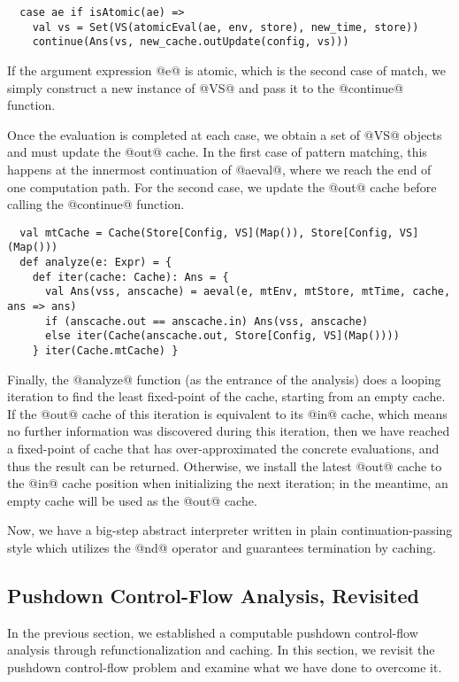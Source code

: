 \documentclass[acmsmall, screen]{acmart}\settopmatter{}
\begin{document}
\begin{lstlisting}
  case ae if isAtomic(ae) =>
    val vs = Set(VS(atomicEval(ae, env, store), new_time, store))
    continue(Ans(vs, new_cache.outUpdate(config, vs)))
\end{lstlisting}

If the argument expression @e@ is atomic, which is the second case of match, we simply
construct a new instance of @VS@ and pass it to the @continue@ function.

Once the evaluation is completed at each case, we obtain a set of @VS@ objects and must
update the @out@ cache. In the first case of pattern matching, this happens at the
innermost continuation of @aeval@, where we reach the end of one computation path.
For the second case, we update the @out@ cache before calling the @continue@ function.

\begin{lstlisting}
  val mtCache = Cache(Store[Config, VS](Map()), Store[Config, VS](Map()))
  def analyze(e: Expr) = {
    def iter(cache: Cache): Ans = {
      val Ans(vss, anscache) = aeval(e, mtEnv, mtStore, mtTime, cache, ans => ans)
      if (anscache.out == anscache.in) Ans(vss, anscache)
      else iter(Cache(anscache.out, Store[Config, VS](Map())))
    } iter(Cache.mtCache) }
\end{lstlisting}

Finally, the @analyze@ function (as the entrance of the analysis) does a looping iteration
to find the least fixed-point of the cache, starting from an empty cache.
If the @out@ cache of this iteration is equivalent to its @in@ cache, which means no further
information was discovered during this iteration, then we have reached a fixed-point of cache that
has over-approximated the concrete evaluations, and thus the result can be returned.
Otherwise, we install the latest @out@ cache to the @in@ cache position when initializing
the next iteration; in the meantime, an empty cache will be used as the @out@ cache.

Now, we have a big-step abstract interpreter written in plain continuation-passing style which
utilizes the @nd@ operator and guarantees termination by caching.

\subsection{Pushdown Control-Flow Analysis, Revisited} \label{pdcfarevisit}

In the previous section, we established a computable pushdown control-flow
analysis through refunctionalization and caching. In this section, we revisit
the pushdown control-flow problem and examine what we have done to overcome it. \\
\end{document}
